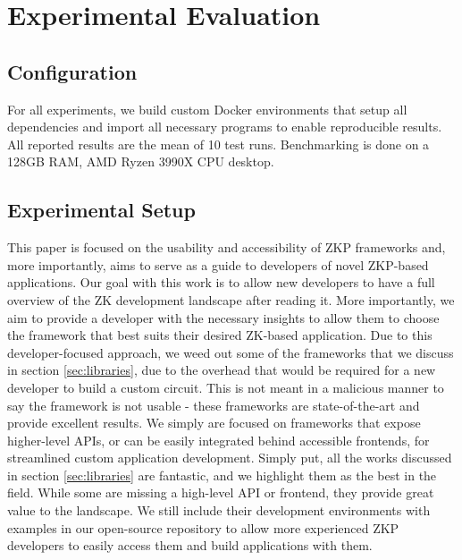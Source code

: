 \section{Experimental Evaluation}

\subsection{Configuration}
For all experiments, we build custom Docker environments that setup all dependencies and import all necessary programs to enable reproducible results. All reported results are the mean of 10 test runs. Benchmarking is done on a 128GB RAM, AMD Ryzen 3990X CPU desktop.

\subsection{Experimental Setup}
This paper is focused on the usability and accessibility of ZKP frameworks and, more importantly, aims to serve as a guide to developers of novel ZKP-based applications. Our goal with this work is to allow new developers to have a full overview of the ZK development landscape after reading it. More importantly, we aim to provide a developer with the necessary insights to allow them to choose the framework that best suits their desired ZK-based application. Due to this developer-focused approach, we weed out some of the frameworks that we discuss in section \ref{sec:libraries}, due to the overhead that would be required for a new developer to build a custom circuit. This is not meant in a malicious manner to say the framework is not usable - these frameworks are state-of-the-art and provide excellent results. We simply are focused on frameworks that expose higher-level APIs, or can be easily integrated behind accessible frontends, for streamlined custom application development. Simply put, all the works discussed in section \ref{sec:libraries} are fantastic, and we highlight them as the best in the field. While some are missing a high-level API or frontend, they provide great value to the landscape. We still include their development environments with examples in our open-source repository to allow more experienced ZKP developers to easily access them and build applications with them.

